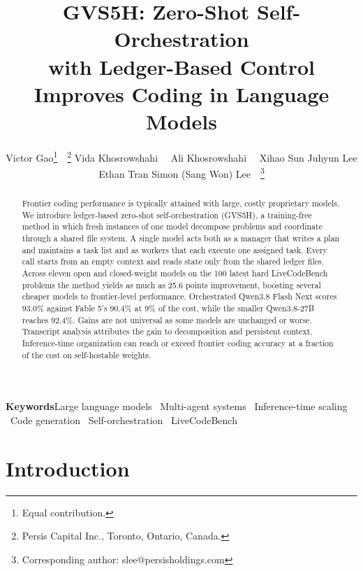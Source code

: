 \documentclass{article}
\title{GVS5H: Zero-Shot Self-Orchestration \\
with Ledger-Based Control \\
Improves Coding in Language Models}
\author{%
  Victor Gao\thanks{Equal contribution.}\ \ \thanks{Persis Capital Inc.,
  Toronto, Ontario, Canada.} \quad
  Vida Khosrowshahi\footnotemark[1]\ \ \footnotemark[2] \quad
  Ali Khosrowshahi\footnotemark[1]\ \ \footnotemark[2] \AND
  Xihao Sun\footnotemark[2] \quad
  Juhyun Lee \quad
  Ethan Tran\footnotemark[2] \quad
  Simon (Sang Won) Lee\footnotemark[2]\ \ \thanks{Corresponding author:
  slee@persisholdings.com}
}
\begin{document}
\maketitle

\lhead{}

\begin{abstract}
Frontier coding performance is typically attained with large, costly proprietary models. We introduce ledger-based zero-shot self-orchestration (GVS5H), a training-free method in which fresh instances of one model decompose problems and coordinate through a shared file system.
A single model acts both as a manager that writes a plan and maintains a task list and as workers that each execute one assigned task. Every call starts from an empty context and reads state only from the shared ledger files.
Across eleven open and closed-weight models on the 100 latest hard LiveCodeBench problems
the method yields as much as 25.6 points improvement, boosting several cheaper models to frontier-level performance.
Orchestrated Qwen3.8 Flash Next scores 93.0\% against Fable 5's 90.4\% at 9\% of the cost, while the smaller Qwen3.8-27B reaches 92.4\%.
Gains are not universal as some models are unchanged or worse. Transcript analysis attributes the gain to decomposition and persistent context.
Inference-time organization can reach or exceed frontier coding accuracy at a fraction of the cost on self-hostable weights.
\end{abstract}

\vskip 0.2in
\begin{center}
\begin{minipage}{0.85\textwidth}
\noindent\textbf{Keywords}\quad Large language models \textperiodcentered\ Multi-agent
systems \textperiodcentered\ Inference-time scaling \textperiodcentered\ Code generation
\textperiodcentered\ Self-orchestration \textperiodcentered\ LiveCodeBench
\end{minipage}
\end{center}
\vskip 0.2in

\section{Introduction}
\label{sec:intro}
\end{document}
